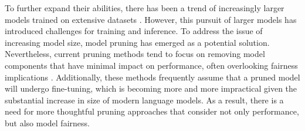 \documentclass[letterpaper]{article} %
\newcommand{\goncalo}[1]
{\textcolor{orange}{{\bf}{\em #1}{\bf}}}
\begin{document}
To further expand their abilities, there has been a trend of increasingly larger models trained on extensive datasets \cite{smith2022using,brown2020language,cohen2022lamda,rae2021scaling,lieber2021jurassic,hoffmann2022training}. However, this pursuit of larger models has introduced challenges for training and inference. To address the issue of increasing model size, model pruning has emerged as a potential solution. Nevertheless, current pruning methods tend to focus on removing model components that have minimal impact on performance, often overlooking fairness implications \cite{Fan2020Reducing,voita-etal-2019-analyzing,fan-etal-2021-layer,behnke-heafield-2021-pruning,prasanna-etal-2020-bert,voita-etal-2019-analyzing}. Additionally, these methods frequently assume that a pruned model will undergo fine-tuning, which is becoming more and more impractical given the substantial increase in size of 
modern language models. As a result, there is a need for more thoughtful pruning approaches that consider not only performance, but also model fairness.%
\end{document}
